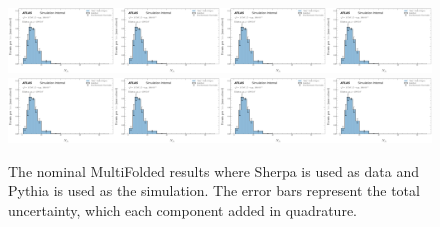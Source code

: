 \begin{figure}[h!]
\includegraphics[width=0.25\textwidth,page=17]{figures/SimResults/MultiFoldTotalErrors.pdf}\includegraphics[width=0.25\textwidth,page=18]{figures/SimResults/MultiFoldTotalErrors.pdf}\includegraphics[width=0.25\textwidth,page=19]{figures/SimResults/MultiFoldTotalErrors.pdf}\includegraphics[width=0.25\textwidth,page=20]{figures/SimResults/MultiFoldTotalErrors.pdf}\\
\includegraphics[width=0.25\textwidth,page=21]{figures/SimResults/MultiFoldTotalErrors.pdf}\includegraphics[width=0.25\textwidth,page=22]{figures/SimResults/MultiFoldTotalErrors.pdf}\includegraphics[width=0.25\textwidth,page=23]{figures/SimResults/MultiFoldTotalErrors.pdf}\includegraphics[width=0.25\textwidth,page=24]{figures/SimResults/MultiFoldTotalErrors.pdf}
\caption{The nominal MultiFolded results where Sherpa is used as data and Pythia is used as the simulation. The error bars represent the total uncertainty, which each component added in quadrature.}
\label{fig:simresultsmulti_nominal}
\end{figure}

